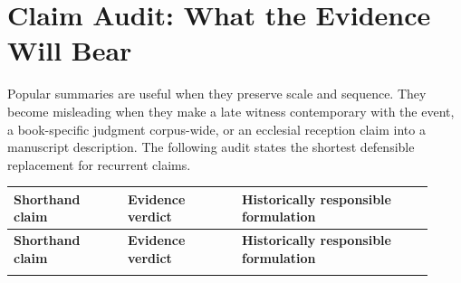 \section{Claim Audit: What the Evidence Will Bear}

Popular summaries are useful when they preserve scale and sequence. They become misleading when they make a late witness contemporary with the event, a book-specific judgment corpus-wide, or an ecclesial reception claim into a manuscript description. The following audit states the shortest defensible replacement for recurrent claims.

\begin{longtable}{>{\bfseries\RaggedRight\arraybackslash}p{0.25\linewidth}>{\RaggedRight\arraybackslash}p{0.25\linewidth}>{\RaggedRight\arraybackslash}p{0.42\linewidth}}
\toprule
\textbf{Shorthand claim} & \textbf{Evidence verdict} & \textbf{Historically responsible formulation}\\
\midrule
\endfirsthead
\toprule
\textbf{Shorthand claim} & \textbf{Evidence verdict} & \textbf{Historically responsible formulation}\\
\midrule
\endhead
\bottomrule
\endfoot


\end{longtable}
